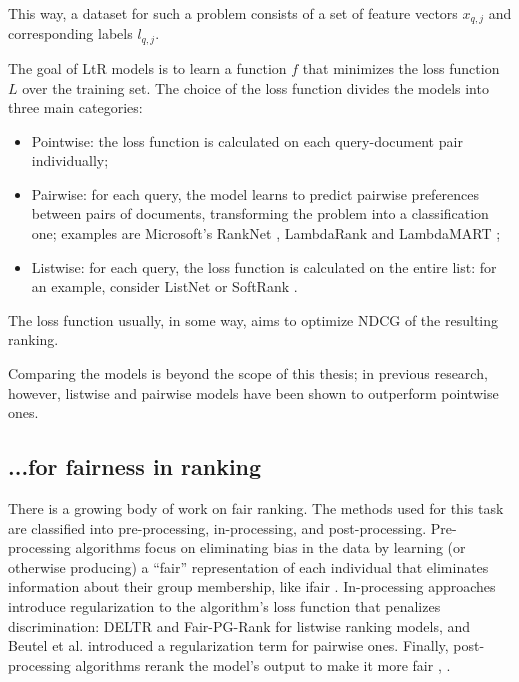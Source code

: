 This way, a dataset for such a problem consists of a set of feature vectors $x_{q,j}$ and corresponding labels $l_{q,j}$.

The goal of LtR models is to learn a function $f$ that minimizes the loss function $L$ over the training set. The choice of the loss function divides the models into three main categories:

\begin{itemize}
\item Pointwise: the loss function is calculated on each query-document pair individually;
\item Pairwise: for each query, the model learns to predict pairwise preferences between pairs of documents, transforming the problem into a classification one;
examples are Microsoft’s RankNet \cite{RankNet}, LambdaRank \cite{LambdaRank} and LambdaMART \cite{LambdaMART};
\item Listwise: for each query, the loss function is calculated on the entire list: for an example, consider ListNet \cite{ListNet} or SoftRank \cite{taylor2008softrank}.
\end{itemize}

The loss function usually, in some way, aims to optimize NDCG of the resulting ranking.

Comparing the models is beyond the scope of this thesis; in previous research, however, listwise \cite{10.1145/2866571} and pairwise \cite{RankNet} models have been shown to outperform pointwise ones.

\subsection{...for fairness in ranking}

There is a growing body of work on fair ranking. The methods used for this task are classified into pre-processing, in-processing, and post-processing. Pre-processing algorithms focus on eliminating bias in the data by learning (or otherwise producing) a “fair” representation of each individual that eliminates information about their group membership, like ifair \cite{ifair}. In-processing approaches introduce regularization to the algorithm’s loss function that penalizes discrimination: DELTR \cite{DELTR} and Fair-PG-Rank \cite{fpgrank} for listwise ranking models, and Beutel et al. \cite{beutelpairwise} introduced a regularization term for pairwise ones. Finally, post-processing algorithms rerank the model’s output to make it more fair \cite{linkedin}, \cite{RAPF}.


